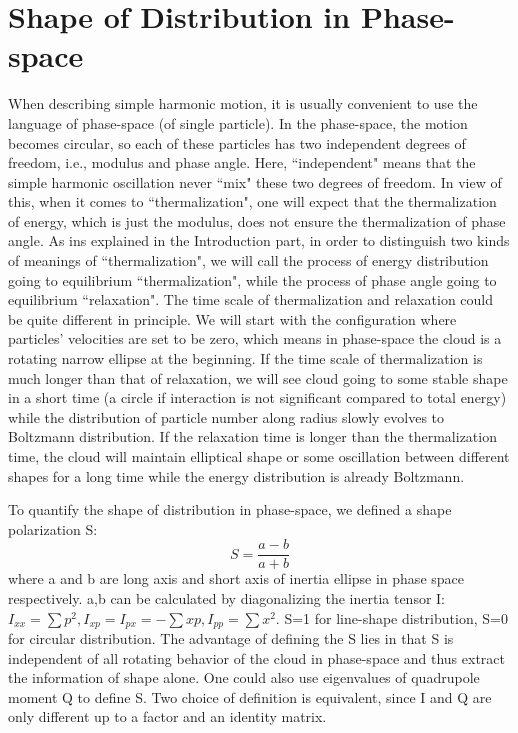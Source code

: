 \documentclass[aps,preprintnumbers,onecolumn,amsmath,amssymb,floatfix,pra]{revtex4-1}
\begin{document}
\section{Shape of Distribution in Phase-space}\label{section:Shape}
When describing simple harmonic motion, it is usually convenient to use the language of phase-space (of single particle). In the phase-space, the motion becomes circular, so each of these particles has two independent degrees of freedom, i.e., modulus and phase angle. Here, ``independent" means that the simple harmonic oscillation never ``mix" these two degrees of freedom. In view of this, when it comes to ``thermalization", one will expect that the thermalization of energy, which is just the modulus, does not ensure the thermalization of phase angle. As ins explained in the Introduction part, in order to distinguish two kinds of meanings of ``thermalization", we will call the process of energy distribution going to equilibrium ``thermalization", while the process of phase angle going to equilibrium ``relaxation". The time scale of thermalization and relaxation could be quite different in principle. We will start with the configuration where particles' velocities are set to be zero, which means in phase-space the cloud is a rotating narrow ellipse at the beginning. If the time scale of thermalization is much longer than that of relaxation, we will see cloud going to some stable shape in a short time (a circle if interaction is not significant compared to total energy) while the distribution of particle number along radius slowly evolves to Boltzmann distribution. If the relaxation time is longer than the thermalization time, the cloud will maintain elliptical shape or some oscillation between different shapes for a long time while the energy distribution is already Boltzmann.

To quantify the shape of distribution in phase-space, we defined a shape polarization S:
\begin{equation}
S=\frac{a-b}{a+b}
\end{equation}
where a and b are long axis and short axis of inertia ellipse in phase space respectively. a,b can be calculated by diagonalizing the inertia tensor I: $I_{xx}=\sum{p^2}, I_{xp}=I_{px}=-\sum{xp},I_{pp}=\sum{x^2}$. S=1 for line-shape distribution, S=0 for circular distribution. The advantage of defining the S lies in that S is independent of all rotating behavior of the cloud in phase-space and thus extract the information of shape alone. One could also use eigenvalues of quadrupole moment Q to define S. Two choice of definition is equivalent, since I and Q are only different up to a factor and an identity matrix.
\end{document}
